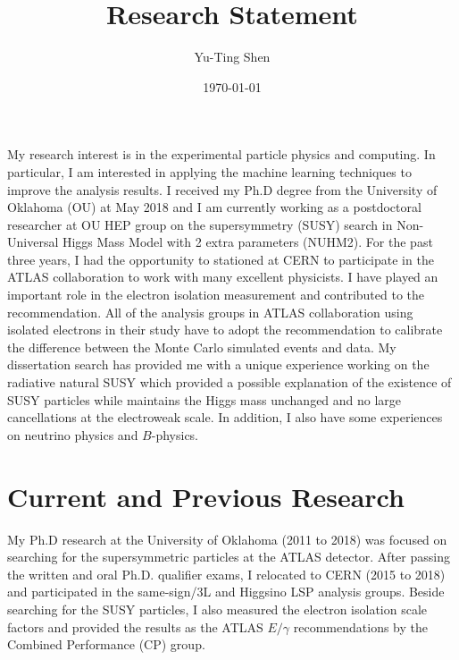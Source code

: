 \documentclass[12pt]{article}
\title{Research Statement}
\author{Yu-Ting Shen}
\affil{Department of Physics and Astronomy\\ University of Oklahoma}
\date{\today}
\begin{document}
\maketitle

My research interest is in the experimental particle physics and computing.
In particular, I am interested in applying the machine learning techniques to improve the analysis results.
I received my Ph.D degree from the University of Oklahoma (OU) at May 2018 and I am currently working as a postdoctoral researcher at OU HEP group on the supersymmetry (SUSY) search in Non-Universal Higgs Mass Model with 2 extra parameters (NUHM2).
For the past three years, I had the opportunity to stationed at CERN to participate in the ATLAS collaboration to work with many excellent physicists.
I have played an important role in the electron isolation measurement and contributed to the recommendation.
All of the analysis groups in ATLAS collaboration using isolated electrons in their study have to adopt the recommendation to calibrate the difference between the Monte Carlo simulated events and data.
My dissertation search has provided me with a unique experience working on the radiative natural SUSY which provided a possible explanation of the existence of SUSY particles while maintains the Higgs mass unchanged and no large cancellations at the electroweak scale.
In addition, I also have some experiences on neutrino physics and $B$-physics.


\section{Current and Previous Research}
My Ph.D research at the University of Oklahoma (2011 to 2018) was focused on searching for the supersymmetric particles at the ATLAS detector.
After passing the written and oral Ph.D. qualifier exams, I relocated to CERN (2015 to 2018) and participated in the same-sign/3L and Higgsino LSP analysis groups.
Beside searching for the SUSY particles, I also measured the electron isolation scale factors and provided the results as the ATLAS $E/\gamma$ recommendations by the Combined Performance (CP) group.
\end{document}
